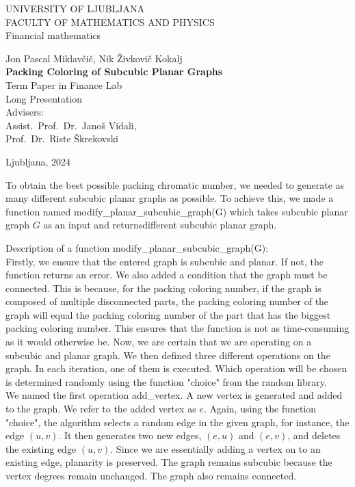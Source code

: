 \documentclass[12pt,a4paper]{amsart}
\theoremstyle{definition}
\theoremstyle{plain}
\newcommand{\program}{Financial mathematics}
\newcommand{\imeavtorja}{Jon Pascal Miklavčič, Nik Živkovič Kokalj}
\newcommand{\imementorja}{Assist.~Prof.~Dr.~Janoš Vidali}
\newcommand{\imesomentorja}{Prof.~Dr.~Riste Škrekovski}
\newcommand{\naslovdela}{Packing Coloring of Subcubic Planar Graphs}
\newcommand{\letnica}{2024}
\begin{document}
\thispagestyle{empty}
{\large
\noindent UNIVERSITY OF LJUBLJANA\\[1mm]
FACULTY OF MATHEMATICS AND PHYSICS\\[5mm]
\program\ }
\vfill

\begin{center}{\large
\imeavtorja\\[2mm]
{\bf \Large \naslovdela}\\[10mm]
{\normalsize Term Paper in Finance Lab}\\[1mm]
{\normalsize Long Presentation}\\[1cm]
{\normalsize Advisers:}\\
{\normalsize \imementorja, \\ \imesomentorja}\\[2mm]}
\end{center}
\vfill

{\large Ljubljana, \letnica}
\pagebreak

To obtain the best possible packing chromatic number, we needed to generate as many different subcubic planar graphs as 
possible.  To achieve this, we made a function named modify\_planar\_subcubic\_graph(G) which takes subcubic planar graph $G$ 
as an input and returnsdifferent subcubic planar graph.

Description of a function modify\_planar\_subcubic\_graph(G):\\

Firstly, we ensure that the entered graph is subcubic and planar. If not, the function returns an error. We also added a 
condition that the graph must be connected. This is because, for the packing coloring number, if the graph is composed of 
multiple disconnected parts, the packing coloring number of the graph will equal the packing coloring number of the part 
that has the biggest packing coloring number. This ensures that the function is not as time-consuming as it would otherwise 
be. Now, we are certain that we are operating on a subcubic and planar graph. We then defined three different operations 
on the graph. In each iteration, one of them is executed. Which operation will be chosen is determined randomly using the 
function "choice" from the random library. \\

We named the first operation add\_vertex. A new vertex is generated and added to the graph. 
We refer to the added vertex as $e$. Again, using the function "choice", the algorithm selects a random edge in the 
given graph, for instance, the edge $(u, v)$. It then generates two new edges, $(e, u)$ and $(e, v)$, and deletes the 
existing edge $(u, v)$. Since we are essentially adding a vertex on to an existing edge, planarity is preserved. The graph 
remains subcubic because the vertex degrees remain unchanged. The graph also remains connected. \\
\end{document}
